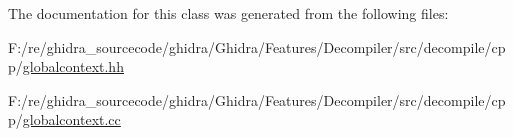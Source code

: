 The documentation for this class was generated from the following files\+:\begin{DoxyCompactItemize}
\item 
F\+:/re/ghidra\+\_\+sourcecode/ghidra/\+Ghidra/\+Features/\+Decompiler/src/decompile/cpp/\mbox{\hyperlink{globalcontext_8hh}{globalcontext.\+hh}}\item 
F\+:/re/ghidra\+\_\+sourcecode/ghidra/\+Ghidra/\+Features/\+Decompiler/src/decompile/cpp/\mbox{\hyperlink{globalcontext_8cc}{globalcontext.\+cc}}\end{DoxyCompactItemize}
